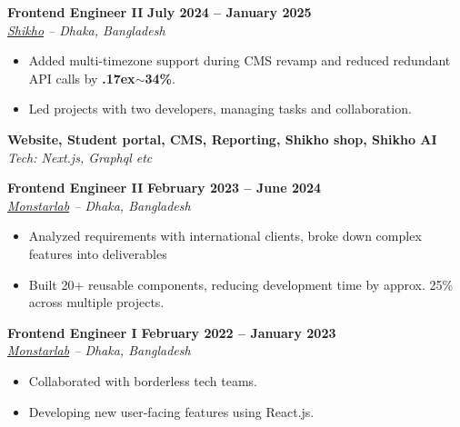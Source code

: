 \documentclass[11pt,a4paper]{article}
\newcommand{\role}[4]{
    \noindent\textbf{\large #1} \hfill \textbf{#2} \\
    \textit{#3} \hfill \textit{#4}
    \vspace{2pt}
}
\newcommand{\project}[2]{
    \noindent\textbf{#1} \hfill \textit{Tech: #2}
    \vspace{1pt}
}
\begin{document}
\vspace{4pt}

\role{Frontend Engineer II}{July 2024 -- January 2025}{\href{https://shikho.com}{Shikho} -- Dhaka, Bangladesh}{}

\begin{itemize}[leftmargin=16pt, nosep]
    \item Added multi-timezone support during CMS revamp and reduced redundant API calls by \textbf{\raise.17ex\hbox{$\scriptstyle\sim$}34\%}.
    \item Led projects with two developers, managing tasks and collaboration.
\end{itemize}

\vspace{4pt}

\vspace{1pt}

\project{Website, Student portal, CMS, Reporting, Shikho shop, Shikho AI} {Next.js, Graphql etc}

\vspace{4pt}

\role{Frontend Engineer II}{February 2023 -- June 2024}{\href{https://monstar-lab.com/bd/}{Monstarlab} -- Dhaka, Bangladesh}{}

\begin{itemize}[leftmargin=16pt, nosep]
    \item Analyzed requirements with international clients, broke down complex features into deliverables
    \item Built 20+ reusable components, reducing development time by approx. 25\% across multiple projects.
\end{itemize}

\vspace{4pt}

\role{Frontend Engineer I}{February 2022 -- January 2023}{\href{https://monstar-lab.com/bd/}{Monstarlab} -- Dhaka, Bangladesh}{}

\begin{itemize}[leftmargin=16pt, nosep]
    \item Collaborated with borderless tech teams.
    \item Developing new user-facing features using React.js.
\end{itemize}
\end{document}
